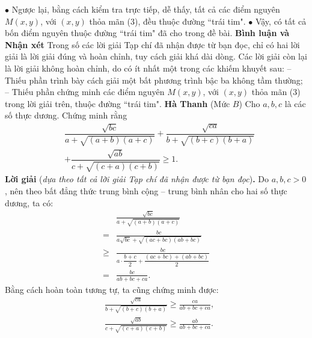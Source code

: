 \begin{multicols}{2}
	$\bullet$ Ngược lại, bằng cách kiểm tra trực tiếp, dễ thấy, tất cả các điểm nguyên $M(x, y)$, với $(x, y)$ thỏa mãn ($3$), đều thuộc đường ``trái tim".
	\vskip 0.01cm
	$\bullet$ Vậy, có tất cả bốn điểm nguyên thuộc đường ``trái tim" đã cho trong đề bài.
	\vskip 0.01cm
	\textbf{\color{thachthuctoanhoc}Bình luận và Nhận xét}
	\vskip 0.05cm
	Trong số các lời giải Tạp chí đã nhận được từ bạn đọc, chỉ có hai lời giải là lời giải đúng và hoàn chỉnh, tuy cách giải khá dài dòng. Các lời giải còn lại là lời giải không hoàn chỉnh, do có ít nhất một trong các khiếm khuyết sau:
	\vskip 0.05cm
	-- Thiếu phần trình bày cách giải một bất phương trình bậc ba không tầm thường;
	\vskip 0.05cm
	-- Thiếu phần chứng minh các điểm nguyên $M(x, y)$, với $(x, y)$ thỏa mãn ($3$) trong lời giải trên, thuộc đường ``trái tim".
	\vskip 0.1cm
	\hfill	\textbf{\color{thachthuctoanhoc}Hà Thanh}
	\vskip 0.1cm
	{}
	(Mức $B$) Cho $a,b,c$ là các số thực dương. Chứng minh rằng
	\begin{align*}
		&\dfrac{\sqrt{b c}}{a\!+\!\sqrt{(a\!+\!b)(a\!+\!c)}}+\dfrac{\sqrt{c a}}{b+\sqrt{(b+c)(b+a)}}\\
		&+\dfrac{\sqrt{a b}}{c+\sqrt{(c+a)(c+b)}} \geq 1.
	\end{align*}
	\textbf{\color{thachthuctoanhoc}Lời giải} (\textit{dựa theo tất cả lời giải Tạp chí đã nhận được từ bạn đọc})\textbf{\color{thachthuctoanhoc}.}
	\vskip 0.05cm
	Do $a, b, c > 0$, nên theo bất đẳng thức trung bình cộng -- trung bình nhân cho hai số thực dương, ta có:
	\begin{align*}
		&\frac{{\sqrt {bc} }}{{a + \sqrt {\left( {a + b} \right)\left( {a + c} \right)} }} \\[-0.5ex]
		= &\frac{{bc}}{{a\sqrt {bc}  + \sqrt {\left( {ac + bc} \right)\left( {ab + bc} \right)} }}\\[-0.5ex]
		\ge &\frac{{bc}}{{a \cdot \dfrac{{b + c}}{2} + \dfrac{{\left( {ac + bc} \right) + \left( {ab + bc} \right)}}{2}}}\\[-0.5ex]
		= &\frac{{bc}}{{ab + bc + ca}}.
	\end{align*}
	Bằng cách hoàn toàn tương tự, ta cũng chứng minh được:
	\begin{align*}
		&\frac{{\sqrt {ca} }}{{b + \sqrt {\left( {b + c} \right)\left( {b + a} \right)} }} \ge \frac{{ca}}{{ab + bc + ca}},\\[-0.5ex]
		&\frac{{\sqrt {ab} }}{{c + \sqrt {\left( {c + a} \right)\left( {c + b} \right)} }} \ge \frac{{ab}}{{ab + bc + ca}}.
	\end{align*}

\end{multicols}
